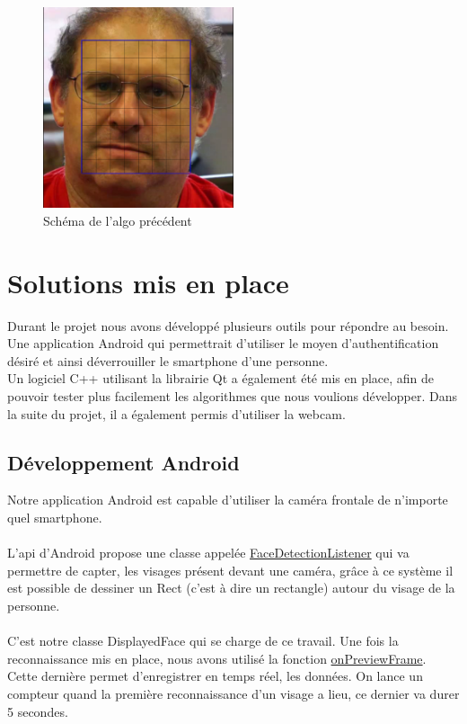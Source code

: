 \begin{figure}[h!]
	\centering
	\includegraphics[width=0.5\textwidth]{data/algo-schema.png}
	\caption{Schéma de l'algo précédent}
\end{figure}


\section{Solutions mis en place}

Durant le projet nous avons développé plusieurs outils pour répondre au besoin. Une application Android qui permettrait d'utiliser le moyen d'authentification désiré et ainsi déverrouiller le smartphone d'une
personne. \\Un logiciel C++ utilisant la librairie Qt a également été mis en place, afin de pouvoir tester plus facilement les algorithmes que nous voulions développer. Dans la suite du projet, il a également
permis d'utiliser la webcam.

\subsection{Développement Android}

Notre application Android est capable d'utiliser la caméra frontale de n'importe quel smartphone. \\\\L'api d'Android propose une classe appelée \href{http://developer.android.com/reference/android/hardware/Camera.FaceDetectionListener.html}{FaceDetectionListener} qui va permettre de
 capter, les visages présent devant une caméra, grâce à ce système il est possible de dessiner un Rect (c'est à dire un rectangle) autour du visage de la personne.\\\\ C'est notre classe
  DisplayedFace qui se charge de ce travail.
Une fois la reconnaissance mis en place, nous avons utilisé la fonction
\href{http://developer.android.com/reference/android/hardware/Camera.PreviewCallback.html#onPreviewFrame\%28byte\%5B\%5D,\%20android.hardware.Camera\%29}{onPreviewFrame}. Cette dernière permet d'enregistrer
en temps réel, les données. On lance un compteur quand la première reconnaissance d'un visage a lieu, ce dernier va durer 5 secondes.\\

